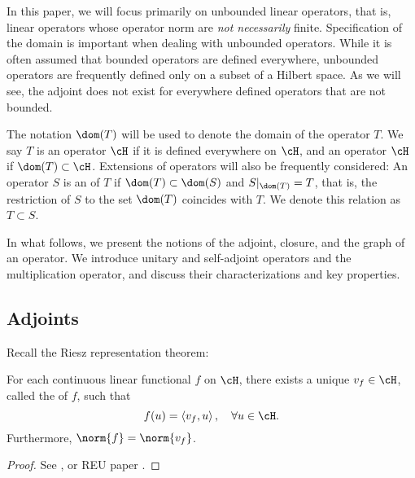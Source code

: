 \documentclass[oneside,reqno,letterpaper]{amsart}
\begin{document}
In this paper, we will focus primarily on unbounded linear operators, that is, linear operators whose operator norm are \textit{not necessarily} finite. 
Specification of the domain is important when dealing with unbounded operators. 
While it is often assumed that bounded operators are defined everywhere, unbounded operators are frequently defined only on a subset of a Hilbert space.
As we will see, the adjoint does not exist for everywhere defined operators that are not bounded. 

The notation \(\dom(T)\) will be used to denote the domain of the operator \(T\). 
We say \(T\) is an operator  \(\cH\) if it is defined everywhere on \(\cH\), and an operator  \(\cH\) if \(\dom(T) \subset \cH\). 
Extensions of operators will also be frequently considered: 
An operator \(S\) is an  of \(T\) if \(\dom(T) \subset \dom(S)\) and \(S|_{\dom(T)} = T\), that is, the restriction of \(S\) to the set \(\dom(T)\) coincides with \(T\). 
We denote this relation as \(T \subset S\). 

In what follows, we present the notions of the adjoint, closure, and the graph of an operator. 
We introduce unitary and self-adjoint operators and the multiplication operator, and discuss their characterizations and key properties.  


\subsection{Adjoints}

Recall the Riesz representation theorem:
\begin{theorem}
\label{thm:riesz-representation}
  For each continuous linear functional \(f\) on \(\cH\), there exists a unique \(v_f \in \cH\), called the  of \(f\), such that \[
    f(u) = \left< v_f, u \right>, \quad \forall  u \in \cH . 
  \] 
  Furthermore, \(\norm{f} = \norm{v_f}\). 
\end{theorem}
\begin{proof}
  See \cite[p.~135]{brezis2011functional}, or REU paper \cite{adler2021hilbert}. 
\end{proof}
\end{document}
